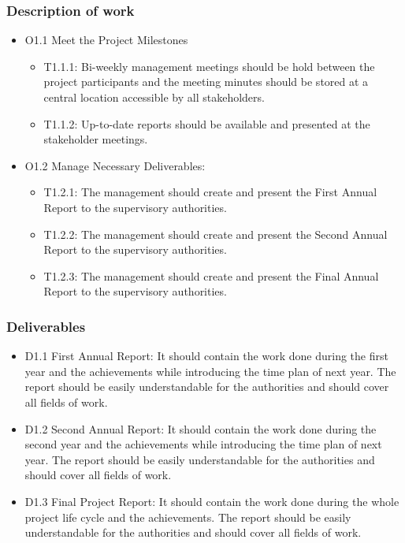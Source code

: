 \subsubsection{Description of work}
\begin{itemize}
	\item O1.1 Meet the Project Milestones
	\begin{itemize}
		\item T1.1.1: Bi-weekly management meetings should be hold between the project participants and the meeting minutes should be stored at a central location accessible by all stakeholders.
		\item T1.1.2: Up-to-date reports should be available and presented at the stakeholder meetings. 
	\end{itemize}
	\item O1.2 Manage Necessary Deliverables:
	\begin{itemize}
		\item T1.2.1: The management should create and present the First Annual Report to the supervisory authorities.   
		\item T1.2.2: The management should create and present the Second Annual Report to the supervisory authorities.
		\item T1.2.3: The management should create and present the Final Annual Report to the supervisory authorities.
	\end{itemize} 
\end{itemize}

\subsubsection{Deliverables}

\begin{itemize}
	\item D1.1 First Annual Report: It should contain the work done during the first year and the achievements while introducing the time plan of next year. The report should be easily understandable for the authorities and should cover all fields of work.
	\item D1.2 Second Annual Report: It should contain the work done during the second year and the achievements while introducing the time plan of next year. The report should be easily understandable for the authorities and should cover all fields of work.  
	\item D1.3 Final Project Report:  It should contain the work done during the whole project life cycle and the achievements. The report should be easily understandable for the authorities and should cover all fields of work.  
\end{itemize}